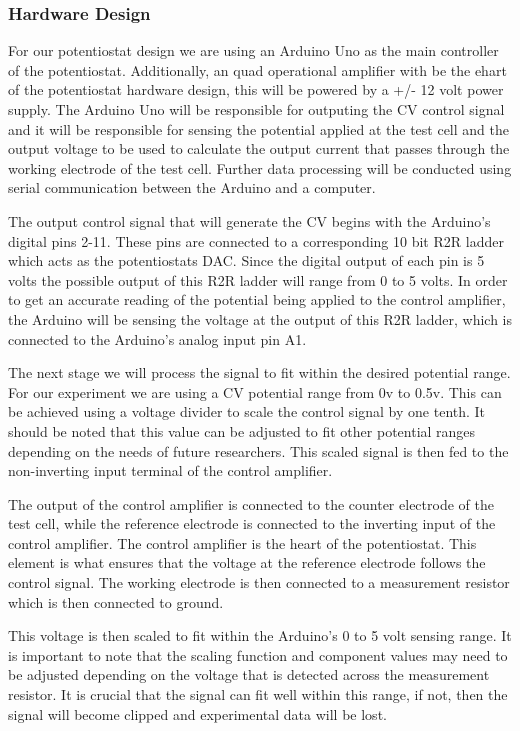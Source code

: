 \documentclass{article}
\begin{document}
\subsubsection*{Hardware Design}
For our potentiostat design we are using an Arduino Uno as the main controller of the potentiostat. Additionally, an quad operational amplifier with be the ehart of the potentiostat hardware design, this will be powered by a +/- 12 volt power supply. The Arduino Uno will be responsible for outputing the CV control signal and it will be responsible for sensing the potential applied at the test cell and the output voltage to be used to calculate the output current that passes through the working electrode of the test cell. Further data processing will be conducted using serial communication between the Arduino and a computer.

The output control signal that will generate the CV begins with the Arduino's digital pins 2-11. These pins are connected to a corresponding 10 bit R2R ladder which acts as the potentiostats DAC. Since the digital output of each pin is 5 volts the possible output of this R2R ladder will range from 0 to 5 volts. In order to get an accurate reading of the potential being applied to the control amplifier, the Arduino will be sensing the voltage at the output of this R2R ladder, which is connected to the Arduino's analog input pin A1.

The next stage we will process the signal to fit within the desired potential range. For our experiment we are using a CV potential range from 0v to 0.5v. This can be achieved using a voltage divider to scale the control signal by one tenth. It should be noted that this value can be adjusted to fit other potential ranges depending on the needs of future researchers. This scaled signal is then fed to the non-inverting input terminal of the control amplifier. 

The output of the control amplifier is connected to the counter electrode of the test cell, while the reference electrode is connected to the inverting input of the control amplifier. The control amplifier is the heart of the potentiostat. This element is what ensures that the voltage at the reference electrode follows the control signal. The working electrode is then connected to a measurement resistor which is then connected to ground. 

This voltage is then scaled to fit within the Arduino's 0 to 5 volt sensing range. It is important to note that the scaling function and component values may need to be adjusted depending on the voltage that is detected across the measurement resistor. It is crucial that the signal can fit well within this range, if not, then the signal will become clipped and experimental data will be lost.
\end{document}
